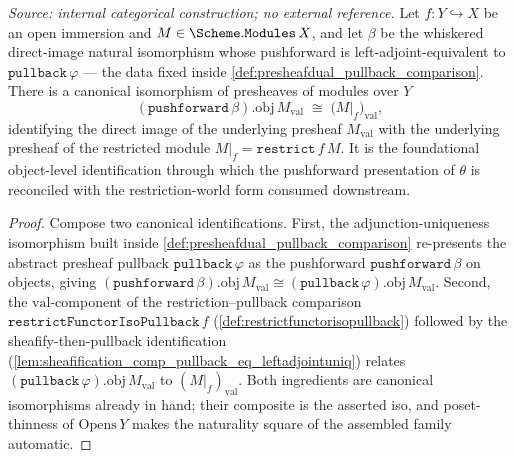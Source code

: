 \begin{definition}

  \label{def:pushforward_obj_val_restrict_iso}
  \textit{Source: internal categorical construction; no external reference.}
  Let \(f : Y \hookrightarrow X\) be an open immersion and \(M \in \Scheme.\mathtt{Modules}\,X\), and let
  \(\beta\) be the whiskered direct-image natural isomorphism whose pushforward is
  left-adjoint-equivalent to \(\mathtt{pullback}\,\varphi\) --- the data fixed inside
  \cref{def:presheafdual_pullback_comparison}. There is a canonical isomorphism of presheaves of modules
  over \(Y\)
  \[
    (\mathtt{pushforward}\,\beta).\mathrm{obj}\,M_{\mathrm{val}}
      \;\cong\; \bigl(M|_f\bigr)_{\mathrm{val}},
  \]
  identifying the direct image of the underlying presheaf \(M_{\mathrm{val}}\) with the underlying
  presheaf of the restricted module \(M|_f = \mathtt{restrict}\,f\,M\). It is the foundational
  object-level identification through which the pushforward presentation of \(\theta\) is reconciled with
  the restriction-world form consumed downstream.
\end{definition}
\begin{proof}
  \leanok
  Compose two canonical identifications. First, the adjunction-uniqueness isomorphism built inside
  \cref{def:presheafdual_pullback_comparison} re-presents the abstract presheaf pullback
  \(\mathtt{pullback}\,\varphi\) as the pushforward \(\mathtt{pushforward}\,\beta\) on objects, giving
  \((\mathtt{pushforward}\,\beta).\mathrm{obj}\,M_{\mathrm{val}} \cong
  (\mathtt{pullback}\,\varphi).\mathrm{obj}\,M_{\mathrm{val}}\). Second, the \(\mathrm{val}\)-component of
  the restriction--pullback comparison \(\mathtt{restrictFunctorIsoPullback}\,f\)
  (\cref{def:restrictfunctorisopullback}) followed by the sheafify-then-pullback identification
  (\cref{lem:sheafification_comp_pullback_eq_leftadjointuniq}) relates
  \((\mathtt{pullback}\,\varphi).\mathrm{obj}\,M_{\mathrm{val}}\) to \((M|_f)_{\mathrm{val}}\). Both
  ingredients are canonical isomorphisms already in hand; their composite is the asserted iso, and
  poset-thinness of \(\mathrm{Opens}\,Y\) makes the naturality square of the assembled family automatic.
\end{proof}

